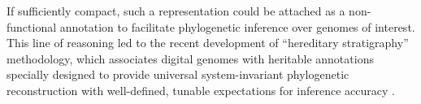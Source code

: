 If sufficiently compact, such a representation could be attached as a non-functional annotation to facilitate phylogenetic inference over genomes of interest.
This line of reasoning led to the recent development of ``hereditary stratigraphy'' methodology, which associates digital genomes with heritable annotations specially designed to provide universal system-invariant phylogenetic reconstruction with well-defined, tunable expectations for inference accuracy
\citep{moreno2022hereditary}.



